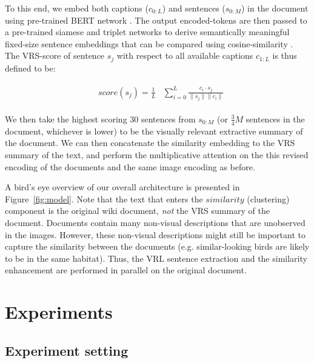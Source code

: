 \documentclass[11pt,a4paper]{article}
\newcommand\gal[1]{\textcolor{bright}{\textbf{GAL:} #1 }}
\newcommand\reut[1]{\textcolor{green}{\textbf{REUT:} #1 }}
\begin{document}
To this end, we embed both captions ($c_{0:L}$) and sentences ($s_{0:M}$) in the document using
pre-trained BERT network  \cite{devlin2019bert}. The output encoded-tokens are then passed to a pre-trained siamese and triplet networks \citep{Schroff_2015_CVPR} to derive semantically meaningful fixed-size sentence embeddings that can be compared using cosine-similarity \citet{reimers2019sentence}.
The VRS-score of sentence $s_j$ with respect to all available captions   $c_{1:L}$  is thus defined to be:

\begin{equation}
\begin{aligned}
\begin{split}
\label{eq:score}
&score(s_j)=  \frac{1}{L}
&\sum_{i=0}^{L} \frac{c_i\cdot s_j}{\| s_j\|\| c_i\| }
\end{split}
\end{aligned}
\end{equation}


We then take the highest scoring  30 sentences from \(s_{0:M}\) (or $\frac{3}{4}M$ sentences in the document, whichever is lower) to be the visually relevant extractive summary of the document. We can then concatenate the similarity embedding to the VRS summary of the text, and perform the multiplicative attention on the this  revised encoding of the documents and the same image encoding as before.\par


A bird's eye 
overview of our overall architecture is presented in Figure~\ref{fig:model}.
Note that the text that enters the $similarity$  (clustering) component is the original wiki document, {\em not} the VRS summary of the document. Documents contain many non-visual descriptions that are unobserved in the images. However, these non-visual descriptions might still be important to capture the similarity between the documents (e.g. similar-looking birds are likely to be in the same habitat). Thus, the VRL sentence extraction and the similarity enhancement are performed in parallel on the original document. 
\section{Experiments}

\subsection{Experiment setting}
\end{document}
